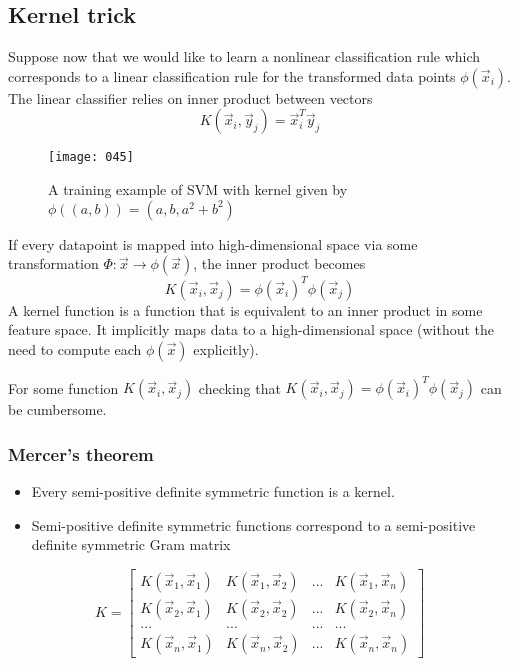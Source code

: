 \subsection{Kernel trick}
Suppose now that we would like to learn a nonlinear classification rule which corresponds to a linear classification rule for the transformed data points \(\phi(\vec{x}_i)\). The linear classifier relies on inner product between vectors
\begin{equation}
    K(\vec{x}_i,\vec{y}_j) = \vec{x}_i^T \vec{y}_j
\end{equation}
\begin{figure}[h]
    \centering
    \texttt{[image: 045]}
    \caption{A training example of SVM with kernel given by \(\phi((a,b)) = (a,b,a^2+b^2)\)}
\end{figure}
If every datapoint is mapped into high-dimensional space via some transformation \(\Phi: \vec{x} \to \phi(\vec{x})\), the inner product becomes
\begin{equation}
    K(\vec{x}_i,\vec{x}_j) = \phi(\vec{x}_i)^T \phi(\vec{x}_j)
\end{equation}
A kernel function is a function that is equivalent to an inner product in some feature space. It implicitly maps data to a high-dimensional space (without the need to compute each \(\phi(\vec{x})\) explicitly).

For some function \(K(\vec{x}_i,\vec{x}_j)\) checking that \(K(\vec{x}_i,\vec{x}_j) = \phi(\vec{x}_i)^T \phi(\vec{x}_j)\) can be cumbersome.

\subsubsection{Mercer's theorem}
\begin{itemize}
    \item Every semi-positive definite symmetric function is a kernel.\\
    \item Semi-positive definite symmetric functions correspond to a semi-positive definite symmetric Gram matrix\\
\end{itemize}
\begin{equation}
    K = 
    \begin{bmatrix}
        K(\vec{x}_1,\vec{x}_1) & K(\vec{x}_1,\vec{x}_2) & ... & K(\vec{x}_1,\vec{x}_n) \\
        K(\vec{x}_2,\vec{x}_1) & K(\vec{x}_2,\vec{x}_2) & ... & K(\vec{x}_2,\vec{x}_n) \\
        ... & ... & ... & ... \\
        K(\vec{x}_n,\vec{x}_1) & K(\vec{x}_n,\vec{x}_2) & ... & K(\vec{x}_n,\vec{x}_n) 
    \end{bmatrix}
\end{equation}

